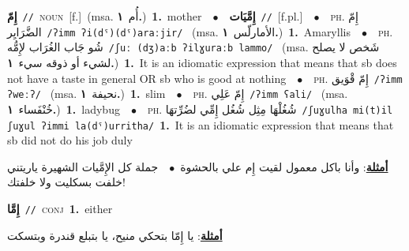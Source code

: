 \documentclass[10pt,a4paper,twoside]{article} %
\begin{document}
\begin{multicols}{2}
{\setlength\topsep{0pt}\textbf{\foreignlanguage{arabic}{إِمّ}}\ {\color{gray}\texttt{//}\color{black}}\ \textsc{noun}\ [f.]\ \color{gray}(msa. \foreignlanguage{arabic}{أُم}~\foreignlanguage{arabic}{\textbf{١.}})\color{black}\ \textbf{1.}~mother\ \ $\bullet$\ \ \setlength\topsep{0pt}\textbf{\foreignlanguage{arabic}{إِمَّيَات}}\ {\color{gray}\texttt{//}\color{black}}\ [f.pl.]\ \ $\bullet$\ \ \textsc{ph.} \color{gray} \foreignlanguage{arabic}{إِمّ الضَّرَايِر}\color{black}\ {\color{gray}\texttt{/{\sffamily ʔimm ʔi(dˤ)(dˤ)araːjir}/}\color{black}}\ \color{gray} (msa. \foreignlanguage{arabic}{الأمارلّس}~\foreignlanguage{arabic}{\textbf{١.}})\color{black}\ \textbf{1.}~Amaryllis\ \ $\bullet$\ \ \textsc{ph.} \color{gray} \foreignlanguage{arabic}{شُو جَاب الغُرَاب لإِمُّه}\color{black}\ {\color{gray}\texttt{/{\sffamily ʃuː (dʒ)aːb ʔilɣuraːb lammo}/}\color{black}}\ \color{gray} (msa. \foreignlanguage{arabic}{شَخص لا يصلح لشيء أو ذوقه سيء}~\foreignlanguage{arabic}{\textbf{١.}})\color{black}\ \textbf{1.}~It is an idiomatic expression that means that sb does not have a taste in general OR sb who is good at nothing\ \ $\bullet$\ \ \textsc{ph.} \color{gray} \foreignlanguage{arabic}{إِمّ قْوَيق}\color{black}\ {\color{gray}\texttt{/{\sffamily ʔimm ʔweːʔ}/}\color{black}}\ \color{gray} (msa. \foreignlanguage{arabic}{نحيفة}~\foreignlanguage{arabic}{\textbf{١.}})\color{black}\ \textbf{1.}~slim\ \ $\bullet$\ \ \textsc{ph.} \color{gray} \foreignlanguage{arabic}{إِمّ عَلِي}\color{black}\ {\color{gray}\texttt{/{\sffamily ʔimm ʕali}/}\color{black}}\ \color{gray} (msa. \foreignlanguage{arabic}{خُنْفَساء}~\foreignlanguage{arabic}{\textbf{١.}})\color{black}\ \textbf{1.}~ladybug\ \ $\bullet$\ \ \textsc{ph.} \color{gray} \foreignlanguage{arabic}{شُغُلْهَا مِثِل شُغُل إِمِّي لضُرِّتهَا}\color{black}\ {\color{gray}\texttt{/{\sffamily ʃuɣulha mi(t)il ʃuɣul ʔimmi la(dˤ)urritha}/}\color{black}}\ \textbf{1.}~It is an idiomatic expression that means that sb did not do his job duly\  \begin{flushright}\color{gray}\foreignlanguage{arabic}{\textbf{\underline{\foreignlanguage{arabic}{أمثلة}}}: وأنا باكل معمول لقيت إِم علي بالحشوة\ $\bullet$\ \  جملة كل الإِمَّيات الشهيرة ياريتني خلفت بسكليت ولا خلفتك!}\end{flushright}\color{black}} \vspace{2mm}

{\setlength\topsep{0pt}\textbf{\foreignlanguage{arabic}{إِمَّا}}\ {\color{gray}\texttt{//}\color{black}}\ \textsc{conj}\ \textbf{1.}~either\  \begin{flushright}\color{gray}\foreignlanguage{arabic}{\textbf{\underline{\foreignlanguage{arabic}{أمثلة}}}: يا إِمّا بتحكي منيح، يا بتبلع قندرة وبتسكت}\end{flushright}\color{black}} \vspace{2mm}


\end{multicols}
\end{document}
